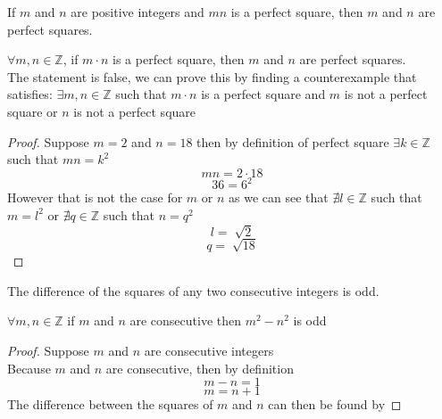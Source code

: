 \documentclass[12pt,letterpaper, onecolumn]{exam}
\begin{document}
\begin{questions}
		\setcounter{question}{56} \question If $m$ and $n$ are positive integers and $mn$ is a perfect square, then $m$ and $n$ are perfect squares.   
		
		\begin{solution}
			$\forall m,n \in \mathbb{Z}$, if $m\cdot n$ is a perfect square, then $m$ and $n$ are perfect squares.\\
			The statement is false, we can prove this by finding a counterexample that satisfies:
			$\exists m,n \in \mathbb{Z}$ such that $m\cdot n$  is a perfect square and $m$ is not a perfect square or $n$ is not a perfect square
			\begin{proof}
			Suppose $m=2$ and $n=18$ then by definition of perfect square $\exists k \in \mathbb{Z}$ such that $mn = k^2$
			$$mn = 2\cdot18$$
			$$36 = 6^2$$
			However that is not the case for $m$ or $n$ as we can see that $\nexists l \in \mathbb{Z}$ such that $m=l^2$ or $\nexists q \in \mathbb{Z}$ such that $n=q^2$
			$$l = \sqrt[]{2}$$
			$$q = \sqrt[]{18}$$
			\end{proof}
		\end{solution}
		
		\setcounter{question}{57} \question The difference of the squares of any two consecutive integers is odd. 
		
		\begin{solution}
			$\forall m,n \in \mathbb{Z}$ if $m$ and $n$ are consecutive then $m^2-n^2$ is odd
			\begin{proof}
				Suppose $m$ and $n$ are consecutive integers\\
				Because $m$ and $n$ are consecutive, then by definition\\
				$$m-n=1$$ 
				$$m=n+1$$
				The difference between the squares of $m$ and $n$ can then be found by 
			\end{proof}
		\end{solution}
	\end{questions}
	
\end{document}
